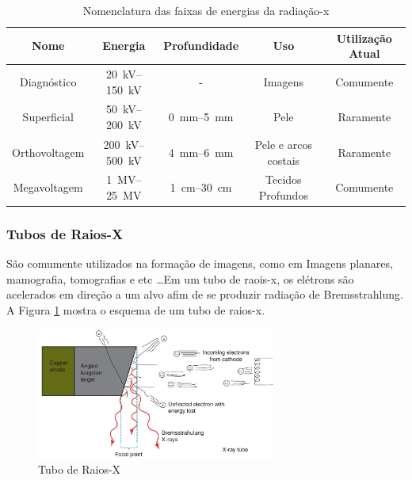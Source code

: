 \documentclass[11pt,a4paper]{article}
\begin{document}
                \begin{table}
                    \centering
                    \caption{Nomenclatura das faixas de energias da radiação-x}
                    \label{tab:nomesRadiacaoX}
                    \begin{tabular}{c c c c c}
                        \hline
                        Nome & Energia & Profundidade & Uso & Utilização Atual \\
                        \hline
                        Diagnóstico & \qtyrange{20}{150}{kV} & - & Imagens & Comumente \\
                        Superficial & \qtyrange{50}{200}{kV} & \qtyrange{0}{5}{mm}  & Pele & Raramente \\
                        Orthovoltagem & \qtyrange{200}{500}{kV} & \qtyrange{4}{6}{mm}  & Pele e arcos costais & Raramente \\
                        Megavoltagem & \qtyrange{1}{25}{MV} & \qtyrange{1}{30}{cm}  & Tecidos Profundos & Comumente \\
                        \hline
                        \hline
                    \end{tabular}
                \end{table}
        
            \subsubsection{Tubos de Raios-X}

                São comumente utilizados na formação de imagens, como em Imagens planares, mamografia, tomografias  e etc \dots Em um tubo de raois-x, os elétrons são acelerados em direção a um alvo afim de se produzir radiação de Bremsstrahlung. A Figura \ref{fig:tuboDeRaiosX} mostra o esquema de um tubo de raios-x.

                    \begin{figure}[h]
                        \centering
                        \includegraphics[width=0.7\textwidth]{Imagens/tuboDeRaiosX.jpg}
                        \caption{Tubo de Raios-X}
                        \label{fig:tuboDeRaiosX}
                    \end{figure}
                
\end{document}

